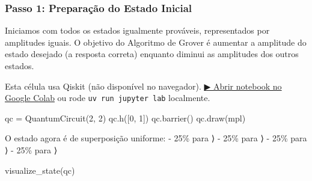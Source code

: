 \documentclass[
  brazilian,
]{report}
\newenvironment{Shaded}{\begin{snugshade}}{\end{snugshade}}
\newcommand{\DecValTok}[1]{\textcolor[rgb]{0.68,0.00,0.00}{#1}}
\newcommand{\NormalTok}[1]{\textcolor[rgb]{0.00,0.23,0.31}{#1}}
\newcommand{\OperatorTok}[1]{\textcolor[rgb]{0.37,0.37,0.37}{#1}}
\newcommand{\StringTok}[1]{\textcolor[rgb]{0.13,0.47,0.30}{#1}}
\begin{document}
\subsubsection{Passo 1: Preparação do Estado
Inicial}\label{passo-1-preparauxe7uxe3o-do-estado-inicial}

Iniciamos com todos os estados igualmente prováveis, representados por
amplitudes iguais. O objetivo do Algoritmo de Grover é aumentar a
amplitude do estado desejado (a resposta correta) enquanto diminui as
amplitudes dos outros estados.

\begin{tcolorbox}[enhanced jigsaw, arc=.35mm, bottomrule=.15mm, bottomtitle=1mm, breakable, colback=white, colbacktitle=quarto-callout-warning-color!10!white, colframe=quarto-callout-warning-color-frame, coltitle=black, left=2mm, leftrule=.75mm, opacityback=0, opacitybacktitle=0.6, rightrule=.15mm, title=\textcolor{quarto-callout-warning-color}{\faExclamationTriangle}\hspace{0.5em}{⚛️ Célula Qiskit --- execute no Colab ou localmente}, titlerule=0mm, toprule=.15mm, toptitle=1mm]

Esta célula usa Qiskit (não disponível no navegador).
\href{https://colab.research.google.com/github/maxwellamaral/aula-quantum/blob/main/notebooks/06-grover.ipynb}{▶
Abrir notebook no Google Colab} ou rode \texttt{uv\ run\ jupyter\ lab}
localmente.

\begin{Shaded}
\begin{Highlighting}[]

\NormalTok{qc }\OperatorTok{=}\NormalTok{ QuantumCircuit(}\DecValTok{2}\NormalTok{, }\DecValTok{2}\NormalTok{)}
\NormalTok{qc.h([}\DecValTok{0}\NormalTok{, }\DecValTok{1}\NormalTok{])}
\NormalTok{qc.barrier()}
\NormalTok{qc.draw(}\StringTok{\textquotesingle{}mpl\textquotesingle{}}\NormalTok{)}
\end{Highlighting}
\end{Shaded}

\end{tcolorbox}

O estado agora é de superposição uniforme: - 25\% para ⟩ -
25\% para ⟩ - 25\% para ⟩ - 25\% para ⟩

\begin{Shaded}
\begin{Highlighting}[]

\NormalTok{visualize\_state(qc)}
\end{Highlighting}
\end{Shaded}
\end{document}
